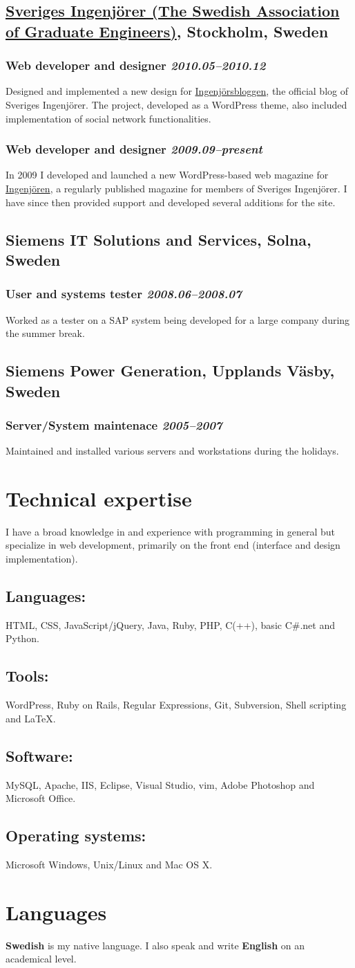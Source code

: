 \documentclass[a4paper,11pt]{article}
\newcommand{\icon}[1]{\textcolor{lightgray}{#1}}
\newcommand{\iconl}[1]{\hspace{-0.5cm}\makebox[0.3cm][c]{\icon{#1}}\hspace{0.2cm}}
\newcommand{\worktitle}[1]{\textbf{#1}}
\newcommand{\duration}[1]{\textsl{#1}}
\newcommand{\theplace}[2][]{\subsection*{\textbf{#2}#1}}
\newcommand{\thework}[2]{\subsubsection*{%
  \iconl{$\blacksquare$}%
  \worktitle{#1}%
  \hfill\duration{#2}}\par%
}
\newcommand{\thebold}[1]{\subsection*{\textbf{#1}}\vspace{-1mm}}
\begin{document}
\theplace[, Stockholm, Sweden]{\href{http://www.sverigesingenjorer.se}{Sveriges Ingenjörer (The Swedish Association of Graduate Engineers)}}

\thework{Web developer and designer}{2010.05--2010.12}
Designed and implemented a new design for \href{http://www.ingenjorsbloggen.se}{Ingenjörsbloggen}, the official blog of Sveriges Ingenjörer. The project, developed as a WordPress theme, also included implementation of social network functionalities.

\thework{Web developer and designer}{2009.09--present}
In 2009 I developed and launched a new WordPress-based web magazine for \href{http://www.ingenjoren.se}{Ingenjören}, a regularly published magazine for members of Sveriges Ingenjörer. I have since then provided support and developed several additions for the site.

\theplace[, Solna, Sweden]{Siemens IT Solutions and Services}

\thework{User and systems tester}{2008.06--2008.07}
Worked as a tester on a SAP system being developed for a large company during the summer break.

\theplace[, Upplands Väsby, Sweden]{Siemens Power Generation}

\thework{Server/System maintenace}{2005--2007}
Maintained and installed various servers and workstations during the holidays.
\section*{Technical expertise}%
I have a broad knowledge in and experience with programming in general but specialize in web development, primarily on the front end (interface and design implementation).

\thebold{Languages:} HTML, CSS, JavaScript/jQuery, Java, Ruby, PHP, C(++), basic C\#.net and Python.

\thebold{Tools:} WordPress, Ruby on Rails, Regular Expressions, Git, Subversion, Shell scripting and LaTeX.

\thebold{Software:} MySQL, Apache, IIS, Eclipse, Visual Studio, vim, Adobe Photoshop and Microsoft Office.

\thebold{Operating systems:} Microsoft Windows, Unix/Linux and Mac OS X.
\section*{Languages}%
\textbf{Swedish} is my native language. I also speak and write \textbf{English} on an academical level.
\end{document}
